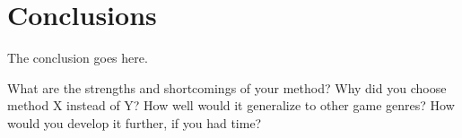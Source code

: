 \section{Conclusions}
\label{06}
The conclusion goes here.

What are the strengths and shortcomings of your method? Why did you choose method X instead of Y? How well would it generalize to other game genres? How would you develop it further, if you had time?